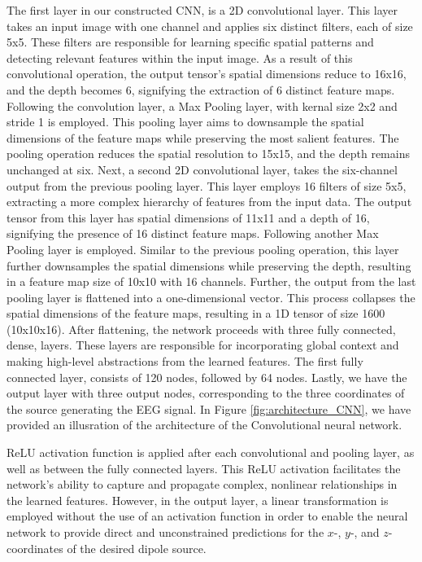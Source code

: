 \documentclass[a4paper, UKenglish, 11pt]{uiomaster}
\begin{document}
The first layer in our constructed CNN, is a 2D convolutional layer. This layer takes an input image with one channel and applies six distinct filters, each of size 5x5. These filters are responsible for learning specific spatial patterns and detecting relevant features within the input image. As a result of this convolutional operation, the output tensor's spatial dimensions reduce to 16x16, and the depth becomes 6, signifying the extraction of 6 distinct feature maps. Following the convolution layer, a Max Pooling layer, with kernal size 2x2 and stride 1 is employed. This pooling layer aims to downsample the spatial dimensions of the feature maps while preserving the most salient features. The pooling operation reduces the spatial resolution to 15x15, and the depth remains unchanged at six. Next, a second 2D convolutional layer, takes the six-channel output from the previous pooling layer. This layer employs 16 filters of size 5x5, extracting a more complex hierarchy of features from the input data. The output tensor from this layer has spatial dimensions of 11x11 and a depth of 16, signifying the presence of 16 distinct feature maps. Following another Max Pooling layer is employed. Similar to the previous pooling operation, this layer further downsamples the spatial dimensions while preserving the depth, resulting in a feature map size of 10x10 with 16 channels. Further, the output from the last pooling layer is flattened into a one-dimensional vector. This process collapses the spatial dimensions of the feature maps, resulting in a 1D tensor of size 1600 (10x10x16). After flattening, the network proceeds with three fully connected, dense, layers. These layers are responsible for incorporating global context and making high-level abstractions from the learned features. The first fully connected layer, consists of 120 nodes, followed by 64 nodes. Lastly, we have the output layer with three output nodes, corresponding to the three coordinates of the source generating the EEG signal. In Figure \ref{fig:architecture_CNN}, we have provided an illusration of the architecture of the Convolutional neural network.

ReLU activation function is applied after each convolutional and pooling layer, as well as between the fully connected layers. This ReLU activation facilitates the network's ability to capture and propagate complex, nonlinear relationships in the learned features. However, in the output layer, a linear transformation is employed without the use of an activation function in order to enable the neural network to provide direct and unconstrained predictions for the $x$-, $y$-, and $z$-coordinates of the desired dipole source.
\end{document}
